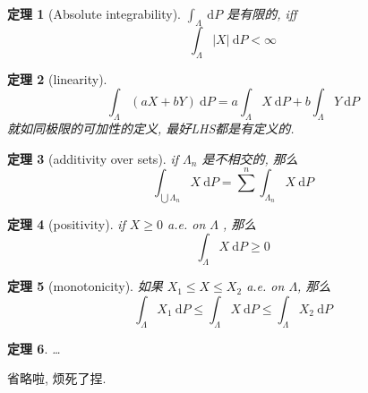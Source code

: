 \documentclass[a4paper, 10pt]{ctexart} %
\newtheorem{theorem}{定理}
\begin{document}
    \begin{theorem}[Absolute integrability]
        $\int _{\Lambda}\ \mathrm{d}P$ 是有限的, iff 
        \[
        \int _{\Lambda} \left| X \right| \ \mathrm{d}P < \infty
        \]
    \end{theorem}
    \begin{theorem}[linearity]
        \[
        \int _{\Lambda}\left(aX + bY\right) \ \mathrm{d}P = a \int _{\Lambda  } X \ \mathrm{d}P + b \int _{\Lambda} Y \ \mathrm{d}P
        \]
        就如同极限的可加性的定义, 最好LHS都是有定义的.
    \end{theorem}
    \begin{theorem}[additivity over sets]
        if $\Lambda _{n}$ 是不相交的, 那么
        \[
        \int _{\bigcup \Lambda _{n}} X \ \mathrm{d}P = \sum_{} ^{n} \int _{\Lambda _{n}} X \ \mathrm{d} P
        \]
    \end{theorem}
    \begin{theorem}[positivity]
        if $X \ge 0$ a.e. on $\Lambda$ , 那么 
        \[
        \int _{\Lambda} X \ \mathrm{d}P  \ge 0
        \]
    \end{theorem}
    \begin{theorem}[monotonicity]
        如果 $X _{1} \le X \le X_{2}$ a.e. on $\Lambda$, 那么
        \[
        \int _{\Lambda} X_{1} \ \mathrm{d}P \le \int _{\Lambda} X \ \mathrm{d} P \le \int _{\Lambda} X_{2} \ \mathrm{d}P
        \]
    \end{theorem}
    \begin{theorem}
        \dots
    \end{theorem}
    省略啦, 烦死了捏.
\end{document}
